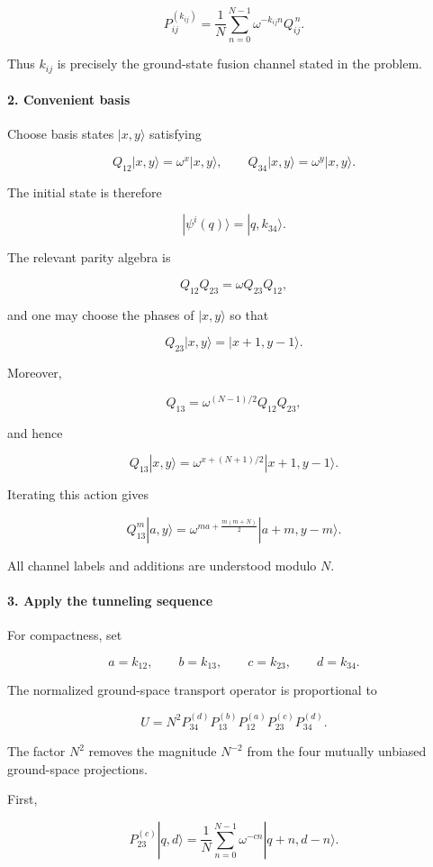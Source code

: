 \documentclass[11pt]{article}
\begin{document}
\[
P_{ij}^{(k_{ij})}
=
\frac1N\sum_{n=0}^{N-1}
\omega^{-k_{ij}n}Q_{ij}^{\,n}.
\]

Thus $k_{ij}$ is precisely the ground-state fusion channel stated in the problem.

\paragraph*{2. Convenient basis}

Choose basis states $|x,y\rangle$ satisfying

\[
Q_{12}|x,y\rangle=\omega^x|x,y\rangle,
\qquad
Q_{34}|x,y\rangle=\omega^y|x,y\rangle.
\]

The initial state is therefore

\[
|\psi^i(q)\rangle=|q,k_{34}\rangle.
\]

The relevant parity algebra is

\[
Q_{12}Q_{23}=\omega Q_{23}Q_{12},
\]

and one may choose the phases of $|x,y\rangle$ so that

\[
Q_{23}|x,y\rangle=|x+1,y-1\rangle.
\]

Moreover,

\[
Q_{13}
=
\omega^{(N-1)/2}Q_{12}Q_{23},
\]

and hence

\[
Q_{13}|x,y\rangle
=
\omega^{x+(N+1)/2}|x+1,y-1\rangle.
\]

Iterating this action gives

\[
Q_{13}^{m}|a,y\rangle
=
\omega^{ma+\frac{m(m+N)}2}
|a+m,y-m\rangle.
\]

All channel labels and additions are understood modulo $N$.

\paragraph*{3. Apply the tunneling sequence}

For compactness, set

\[
a=k_{12},\qquad
b=k_{13},\qquad
c=k_{23},\qquad
d=k_{34}.
\]

The normalized ground-space transport operator is proportional to

\[
U
=
N^2P_{34}^{(d)}
P_{13}^{(b)}
P_{12}^{(a)}
P_{23}^{(c)}
P_{34}^{(d)}.
\]

The factor $N^2$ removes the magnitude $N^{-2}$ from the four mutually unbiased ground-space projections.

First,

\[
P_{23}^{(c)}|q,d\rangle
=
\frac1N
\sum_{n=0}^{N-1}
\omega^{-cn}|q+n,d-n\rangle.
\]
\end{document}
